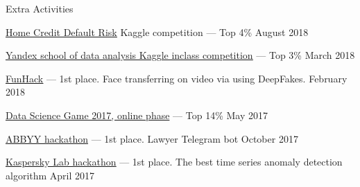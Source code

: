 \documentclass{resume} %
\begin{document}
\begin{rSection}{Extra Activities} \itemsep -1pt {}  

\item \href{https://www.kaggle.com/c/home-credit-default-risk}{\underline{Home Credit Default Risk}} Kaggle competition --- Top 4\% \hfill August 2018

\item \href{https://www.kaggle.com/c/competition-1-yandex-shad-spring-2018}{\underline{Yandex school of data analysis Kaggle inclass competition}} --- Top 3\% \hfill March 2018

\item \href{https://vc.ru/flood/33922-funhack-sobral-razrabotchikov-potehi-radi}{\underline{FunHack}} --- 1st place. Face transferring on video via using DeepFakes. \hfill February 2018

\item \href{https://www.kaggle.com/c/dsg17-online-phase}{\underline{Data Science Game 2017}, online phase} --- Top 14\% \hfill May 2017

\item \href{https://mobility.abbyy.com/hack/}{\underline{ABBYY hackathon}} --- 1st place. Lawyer Telegram bot \hfill October 2017

\item \href{http://miptstream.ru/2017/04/14/mipt-hackathon-kaspersky}{\underline{Kaspersky Lab hackathon}} --- 1st place. The best time series anomaly detection algorithm \hfill April 2017
 

\end{rSection}
\end{document}
